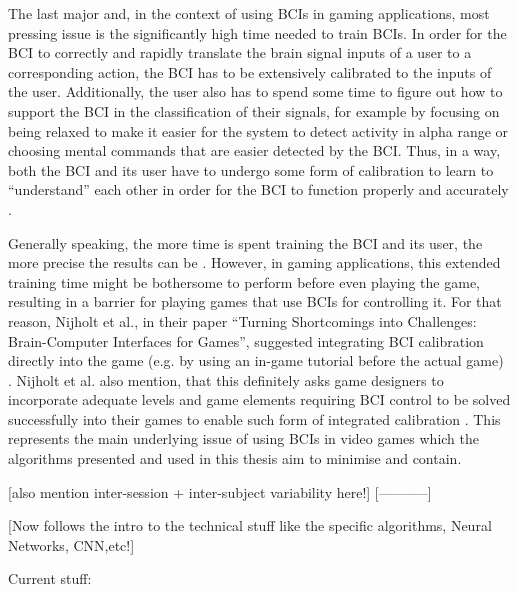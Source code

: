 The last major and, in the context of using BCIs in gaming applications, most pressing issue is the significantly high time needed to train BCIs. 
In order for the BCI to correctly and rapidly translate the brain signal inputs of a user to a corresponding action, the BCI has to be extensively calibrated to the inputs of the user. Additionally, the user also has to spend some time to figure out how to support the BCI in the classification of their signals, for example by focusing on being relaxed to make it easier for the system to detect activity in alpha range or choosing mental commands %
that are easier detected by the BCI. Thus, in a way, both the BCI and its user have to undergo some form of calibration to learn to ``understand'' each other in order for the BCI to function properly and accurately \cite{nijholt-2009}.

Generally speaking, the more time is spent training the BCI and its user, the more precise the results can be \cite{nijholt-2009}. 
However, in gaming applications, this extended training time might be bothersome to perform before even playing the game, resulting in a barrier for playing games that use BCIs for controlling it. For that reason, Nijholt et al., in their paper ``Turning Shortcomings into Challenges: Brain-Computer Interfaces for Games'', suggested integrating BCI calibration directly into the game (e.g. by using an in-game tutorial before the actual game) \cite{nijholt-2009}. Nijholt et al. also mention, that this definitely asks game designers to incorporate adequate levels and game elements requiring BCI control to be solved successfully into their games to enable such form of integrated calibration \cite{nijholt-2009}. 
This represents the main underlying issue of using BCIs in video games which the algorithms presented and used in this thesis aim to minimise and contain. %

[also mention inter-session + inter-subject variability here!]
[-----------]

[Now follows the intro to the technical stuff like the specific algorithms, Neural Networks, CNN,etc!]

Current stuff:

